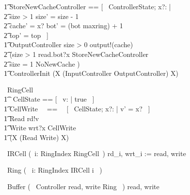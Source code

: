 \documentclass{article} %
\begin{document}
\begin{circus}
		\t1 StoreNewCacheController == [~ \Delta ControllerState; x?: \nat | \\
            \t2 size > 1 \land size' = size - 1 \land \\
            \t2 cache' = x? \land bot' = (bot \mod maxring) + 1 \land \\
            \t2 top' = top ~] \\

        \t1 OutputController \circdef \lcircguard size > 0 \rcircguard \circguard output!(cache) \then \\
            \t2 (\lcircguard size > 1 \rcircguard \circguard read.bot?x \then \lschexpract StoreNewCacheController \rschexpract \extchoice \\
            \t2 \lcircguard size = 1 \rcircguard \circguard \lschexpract NoNewCache \rschexpract) \\

    \t1 \circspot \lschexpract ControllerInit \rschexpract \circseq (\circmu X \circspot (InputController \extchoice OutputController) \circseq X) \\
	\circend
\end{circus}

\begin{circus}
	\circprocess\ RingCell \circdef \circbegin \\
        \t1 \circstate\ CellState == [~ v: \nat | true ~] \\
        \t1 CellWrite ~~==~~ [~ \Delta CellState; x?: \nat | v' = x? ~] \\
        \t1 Read \circdef rd!v \then \Skip \\
        \t1 Write \circdef wrt?x \then \lschexpract CellWrite \rschexpract \\
        \t1 \circspot (\circmu X \circspot (Read \extchoice Write) \circseq X) \\ 
	\circend
\end{circus}

\begin{circus}
    \circprocess\ IRCell \circdef (~i: RingIndex \circindex RingCell~) \lcircrename rd\_i, wrt\_i := read, write \rcircrename 
\end{circus}

\begin{circus}
	\circprocess\ Ring \circdef (~ \Interleave i: RingIndex \circspot IRCell \lcircindex i \rcircindex ~)
\end{circus}

\begin{circus}
	\circprocess\ Buffer \circdef (~ Controller \lpar \lchanset read, write \rchanset \rpar Ring ~) \circhide \lchanset read, write \rchanset
\end{circus}
\end{document}
